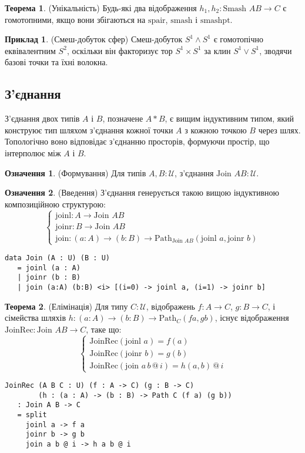 \documentclass{article}
\theoremstyle{definition}
\newtheorem{theorem}{Теорема}
\newtheorem{definition}{Означення}
\newtheorem{example}{Приклад}
\begin{document}
\begin{theorem} (Унікальність)
Будь-які два відображення \( h_1, h_2 : \text{Smash } A B \to C \) є гомотопними,
якщо вони збігаються на \( \text{spair} \), \( \text{smash} \) і \( \text{smashpt} \).
\end{theorem}

\begin{example} (Смеш-добуток сфер)
Смеш-добуток \( S^1 \wedge S^1 \) є гомотопічно еквівалентним \( S^2 \),
оскільки він факторизує тор \( S^1 \times S^1 \) за клин \( S^1 \vee S^1 \),
зводячи базові точки та їхні волокна.
\end{example}

\subsection{З’єднання}
З’єднання двох типів \( A \) і \( B \), позначене \( A * B \),
є вищим індуктивним типом, який конструює тип шляхом
з’єднання кожної точки \( A \) з кожною точкою \( B \) через шлях.
Топологічно воно відповідає з’єднанню просторів, формуючи
простір, що інтерполює між \( A \) і \( B \).

\begin{definition} (Формування)
Для типів \( A, B : \mathcal{U} \), з’єднання \( \text{Join } A B : \mathcal{U} \).
\end{definition}

\begin{definition} (Введення)
З’єднання генерується такою вищою індуктивною композиційною структурою:
\[
\begin{cases}
\text{joinl} : A \to \text{Join } A B \\
\text{joinr} : B \to \text{Join } A B \\
\text{join} : (a : A) \to (b : B) \to \text{Path}_{\text{Join } A B} (\text{joinl } a, \text{joinr } b)
\end{cases}
\]
\begin{lstlisting}
data Join (A : U) (B : U)
   = joinl (a : A)
   | joinr (b : B)
   | join (a:A) (b:B) <i> [(i=0) -> joinl a, (i=1) -> joinr b]
\end{lstlisting}
\end{definition}

\begin{theorem} (Елімінація)
Для типу \( C : \mathcal{U} \), відображень \( f : A \to C \), \( g : B \to C \),
і сімейства шляхів \( h : (a : A) \to (b : B) \to \text{Path}_C (f a, g b) \),
існує відображення \( \text{JoinRec} : \text{Join } A B \to C \), таке що:
\[
\begin{cases}
\text{JoinRec}(\text{joinl } a) = f(a) \\
\text{JoinRec}(\text{joinr } b) = g(b) \\
\text{JoinRec}(\text{join } a \, b \, @ \, i) = h(a, b) \, @ \, i
\end{cases}
\]
\begin{lstlisting}
JoinRec (A B C : U) (f : A -> C) (g : B -> C)
        (h : (a : A) -> (b : B) -> Path C (f a) (g b))
   : Join A B -> C
   = split
     joinl a -> f a
     joinr b -> g b
     join a b @ i -> h a b @ i
\end{lstlisting}
\end{theorem}
\end{document}
